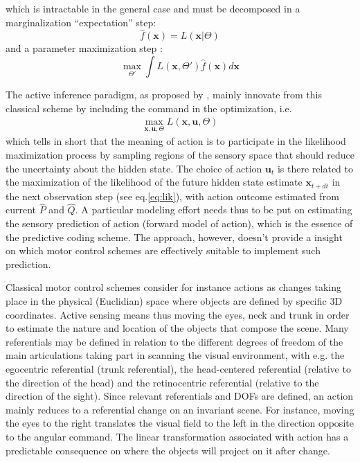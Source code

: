 \documentclass[11pt]{article}
\begin{document}
which is intractable in the general case and must be decomposed in a marginalization ``expectation'' step:
$$\hat{f}(\boldsymbol{x}) = L(\boldsymbol{x}|\Theta)$$
and a parameter maximization step :
$$\max_{\Theta'} \int L(\boldsymbol{x},\Theta')
\hat{f}(\boldsymbol{x}) d\boldsymbol{x} \label{eq:Dempster}$$

The active inference paradigm, as proposed by , mainly innovate from this classical scheme by including the command in the optimization, i.e. 
\begin{align}
\max_{\boldsymbol{x},\boldsymbol{u},\Theta} L(\boldsymbol{x},\boldsymbol{u},\Theta)
\end{align}
which tells in short that the meaning of action is to participate in the likelihood maximization process by sampling regions of the sensory space that should reduce the uncertainty about the hidden state. The choice of action $\boldsymbol{u}_t$ is there related to the maximization of the likelihood of the future hidden state estimate $\boldsymbol{x}_{t+dt}$ in the next observation step (see eq.\ref{eq:lik}), with action outcome estimated from current $\hat{P}$ and $\hat{Q}$. A particular modeling effort needs thus to be put on estimating the sensory prediction of action (forward model of action), which is the essence of the predictive coding scheme.  
The approach, however, doesn't provide a insight on which motor control schemes are effectively suitable to implement such prediction.   

Classical motor control schemes consider for instance actions as changes taking place in the physical (Euclidian) space where objects are defined by specific 3D coordinates. Active sensing means thus moving the eyes, neck and trunk in order to estimate the nature and location of the objects that compose the scene.  
Many referentials may be defined in relation to the different degrees of freedom of the main articulations taking part in scanning the visual environment, with e.g. the egocentric referential (trunk referential), the head-centered referential (relative to the direction of the head) and the retinocentric referential (relative to the direction of the sight). Since relevant referentials and DOFs are defined, an action mainly reduces to a referential change on an invariant scene. For instance, moving the eyes to the right translates the visual field to the left in the direction opposite to the angular command. The  linear transformation associated with action has a predictable consequence on where the objects will project on it after change. 
\end{document}
